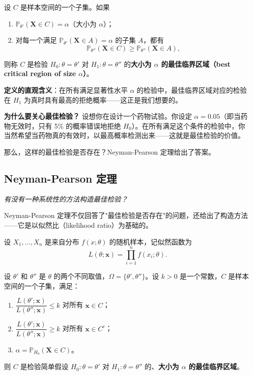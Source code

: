 \begin{definition}[最佳临界区域]\label{def:best-critical-region}
设 $C$ 是样本空间的一个子集。如果
\begin{enumerate}
\item[(a)] $\mathbb{P}_{\theta'}(\mathbf{X} \in C) = \alpha$（大小为 $\alpha$）；
\item[(b)] 对每一个满足 $\mathbb{P}_{\theta'}(\mathbf{X} \in A) = \alpha$ 的子集 $A$，都有
\[
\mathbb{P}_{\theta''}(\mathbf{X} \in C) \geq \mathbb{P}_{\theta''}(\mathbf{X} \in A),
\]
\end{enumerate}
则称 $C$ 是检验 $H_0: \theta = \theta'$ 对 $H_1: \theta = \theta''$ 的\textbf{大小为 $\alpha$ 的最佳临界区域（best critical region of size $\alpha$）}。
\end{definition}

\textbf{定义的直观含义}：在所有满足显著性水平 $\alpha$ 的检验中，最佳临界区域对应的检验在 $H_1$ 为真时具有最高的拒绝概率——这正是我们想要的。

\textbf{为什么要关心最佳检验？} 设想你在设计一个药物试验。你设定 $\alpha = 0.05$（即当药物无效时，只有 5\% 的概率错误地拒绝 $H_0$）。在所有满足这个条件的检验中，你当然希望当药物真的有效时，以最高概率检测出来——这就是最佳检验的价值。

那么，这样的最佳检验是否存在？Neyman-Pearson 定理给出了答案。

\subsection{Neyman-Pearson 定理}

\begin{center}
\textit{有没有一种系统性的方法构造最佳检验？}
\end{center}

Neyman-Pearson 定理不仅回答了"最佳检验是否存在"的问题，还给出了构造方法——它是以似然比（likelihood ratio）为基础的。

\begin{theorem}\label{th:neyman-pearson}
设 $X_1, \ldots, X_n$ 是来自分布 $f(x;\theta)$ 的随机样本，记似然函数为
\[
L(\theta; \mathbf{x}) = \prod_{i=1}^n f(x_i; \theta).
\]

设 $\theta'$ 和 $\theta''$ 是 $\theta$ 的两个不同取值，$\Omega = \{\theta', \theta''\}$。设 $k > 0$ 是一个常数，$C$ 是样本空间的一个子集，满足：

\begin{enumerate}
\item[(a)] $\dfrac{L(\theta';\mathbf{x})}{L(\theta'';\mathbf{x})} \leq k$ 对所有 $\mathbf{x} \in C$；
\item[(b)] $\dfrac{L(\theta';\mathbf{x})}{L(\theta'';\mathbf{x})} \geq k$ 对所有 $\mathbf{x} \in C^c$；
\item[(c)] $\alpha = \mathbb{P}_{H_0}(\mathbf{X} \in C)$。
\end{enumerate}

则 $C$ 是检验简单假设 $H_0: \theta = \theta'$ 对 $H_1: \theta = \theta''$ 的、\textbf{大小为 $\alpha$ 的最佳临界区域}。
\end{theorem}

